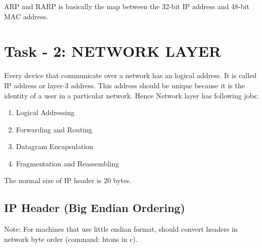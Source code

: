 \documentclass[letterpaper,10pt,english]{sphinxmanual}
\begin{document}
ARP and RARP is basically the map between the 32-bit IP address and 48-bit MAC address.


\section{Task - 2: NETWORK LAYER}
\label{week-06:task-2-network-layer}
Every device that communicate over a network has an logical address. It is called IP address or layer-3 address. This address should be unique because it is the identity of a user in a particular network. Hence Network layer has following jobs:
\begin{enumerate}
\item {} 
Logical Addressing

\item {} 
Forwarding and Routing

\item {} 
Datagram Encapsulation

\item {} 
Fragmentation and Reassembling

\end{enumerate}

The normal size of IP header is 20 bytes.


\subsection{IP Header (Big Endian Ordering)}
\label{week-06:ip-header-big-endian-ordering}
Note: For machines that use little endian format, should convert headers in network byte order (command: htons in c).
\end{document}
